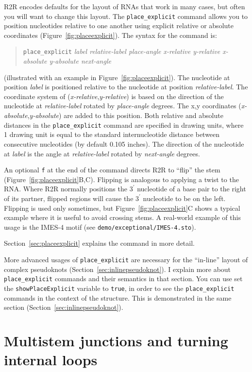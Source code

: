 \documentclass[letterpaper,12pt]{report}
\newcommand{\indexcmd}[1]{\index{R2R commands!\texttt{#1}}}
\newcommand{\example}[1]{
\begin{quote}
{\raggedright
#1
}
\end{quote}
}
\begin{document}
\indexcmd{place\_explicit}
R2R encodes defaults for the layout of RNAs that work in many cases, but often you will want to change this layout.
The {\tt place\_explicit} command allows you to position nucleotides relative to one another using
explicit relative or absolute coordinates (Figure~\ref{fig:placeexplicit}).
The syntax for the command is:
\example{
{\tt place\_explicit} {\it label relative-label place-angle x-relative y-relative x-absolute y-absolute next-angle}
}
(illustrated with an example in Figure~\ref{fig:placeexplicit}).
The nucleotide at position {\it label} is positioned relative to the nucleotide at position {\it relative-label}.
The coordinate system of ({\it x-relative},{\it y-relative}) is based on the direction of the nucleotide at {\it relative-label}
rotated by {\it place-angle} degrees.  
The x,y coordinates ({\it x-absolute},{\it y-absolute}) are added to this position.
Both relative and absolute distances in the {\tt place\_explicit} command are specified in drawing units, where 1 drawing unit is equal to the standard internucleotide distance between consecutive nucleotides (by default 0.105 inches).
The direction of the nucleotide at {\it label} is the angle at {\it relative-label} rotated
by {\it next-angle} degrees.

An optional {\tt f} at the end of the command directs R2R to ``flip'' the stem (Figure~\ref{fig:placeexplicit}B,C).  Flipping is analogous to applying a twist to the RNA.  Where R2R normally positions the $3^\prime$ nucleotide of a base pair to the right of its partner, flipped regions will cause the $3^\prime$ nucleotide to be on the left.
Flipping is used only sometimes, but Figure~\ref{fig:placeexplicit}C shows a typical example where it is useful to avoid crossing stems.  A real-world example of this usage is the IMES-4 motif \cite{CoolRNAs} (see {\tt demo/exceptional/IMES-4.sto}).

Section~\ref{sec:placeexplicit} explains the command in more detail.

More advanced usages of {\tt place\_explicit} are necessary for the ``in-line'' layout of complex pseudoknots
(Section~\ref{sec:inlinepseudoknot}).  I explain more about {\tt place\_explicit} commands and their semantics in that section.
You can use set the {\tt showPlaceExplicit} variable to {\tt true}, in order to see the {\tt place\_explicit} commands
in the context of the structure.
This is demonstrated in the same section (Section~\ref{sec:inlinepseudoknot}).

\section{Multistem junctions and turning internal loops}
\label{sec:demomultistem}
\end{document}
